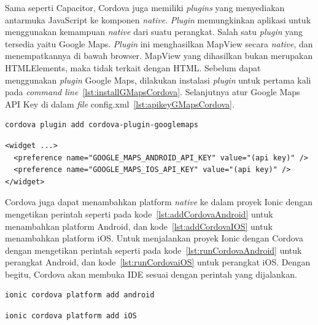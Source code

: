 Sama seperti Capacitor, Cordova juga memiliki \textit{plugins} yang menyediakan antarmuka JavaScript ke komponen \textit{native}. \textit{Plugin} memungkinkan aplikasi untuk menggunakan kemampuan \textit{native} dari suatu perangkat. Salah satu \textit{plugin} yang tersedia yaitu Google Maps. \textit{Plugin} ini menghasilkan MapView secara \textit{native}, dan menempatkannya di bawah browser. MapView yang dihasilkan bukan merupakan HTMLElements, maka tidak terkait dengan HTML. Sebelum dapat menggunakan \textit{plugin} Google Maps, dilakukan instalasi \textit{plugin} untuk pertama kali pada \textit{command line}~\ref{lst:installGMapsCordova}. Selanjutnya atur Google Maps API Key di dalam \textit{file} config.xml~\ref{lst:apikeyGMapsCordova}. 

\begin{lstlisting}[label={lst:installGMapsCordova}, caption=Kode untuk Menginstal \textit{Plugin} Cordova Google Maps]
cordova plugin add cordova-plugin-googlemaps
\end{lstlisting} 

\begin{lstlisting}[label={lst:apikeyGMapsCordova}, caption=Kode untuk Mengatur API Key untuk \textit{Plugin} Cordova Google Maps]
<widget ...>
  <preference name="GOOGLE_MAPS_ANDROID_API_KEY" value="(api key)" />
  <preference name="GOOGLE_MAPS_IOS_API_KEY" value="(api key)" />
</widget>
\end{lstlisting} 

Cordova juga dapat menambahkan platform \textit{native} ke dalam proyek Ionic dengan mengetikan perintah seperti pada kode~\ref{lst:addCordovaAndroid} untuk menambahkan platform Android, dan kode~\ref{lst:addCordovaIOS} untuk menambahkan platform iOS. Untuk menjalankan proyek Ionic dengan Cordova dengan mengetikan perintah seperti pada kode~\ref{lst:runCordovaAndroid} untuk perangkat Android, dan kode~\ref{lst:runCordovaiOS} untuk perangkat iOS. Dengan begitu, Cordova akan membuka IDE sesuai dengan perintah yang dijalankan.

\begin{lstlisting}[label={lst:addCordovaAndroid}, caption=Kode untuk Menambahkan Platform Android dengan Cordova]
ionic cordova platform add android
\end{lstlisting} 

\begin{lstlisting}[label={lst:addCordovaIOS}, caption=Kode untuk Menambahkan Platform iOS dengan Cordova]
ionic cordova platform add iOS
\end{lstlisting} 

